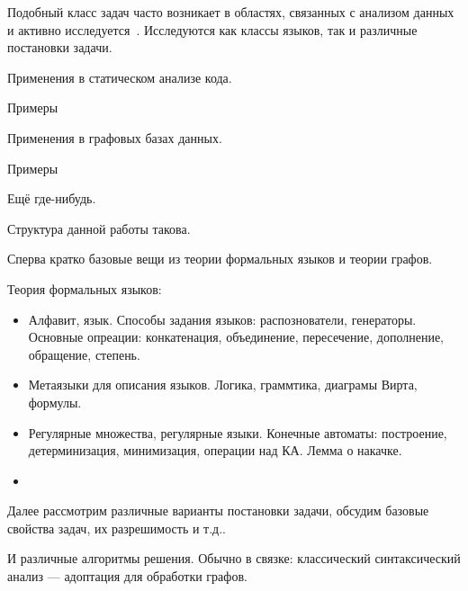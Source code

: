 Подобный класс задач часто возникает в областях, связанных с анализом данных и активно исследуется~\cite{doi:10.1137/S0097539798337716,axelsson2011formal,10.1007/978-3-642-22321-1_24,Ward:2010:CRL:1710158.1710234,barrett2007label,doi:10.1137/S0097539798337716}.
Исследуются как классы языков, так и различные постановки задачи.

Применения в статическом анализе кода.
\begin{example}
Примеры
\end{example}

Применения в графовых базах данных.
\begin{example}
Примеры
\end{example}

Ещё где-нибудь.

Структура данной работы такова.

Сперва кратко базовые вещи из теории формальных языков и теории графов.

Теория формальных языков:
\begin{itemize}
  \item Алфавит, язык. Способы задания языков: распознователи, генераторы. Основные опреации: конкатенация, объединение, пересечение, дополнение, обращение, степень.
  \item Метаязыки для описания языков. Логика, граммтика, диаграмы Вирта, формулы.
  \item Регулярные множества, регулярные языки. Конечные автоматы: построение, детерминизация, минимизация, операции над КА. Лемма о накачке.
  \item
\end{itemize}

Далее рассмотрим различные варианты постановки задачи, обсудим базовые свойства задач, их разрешимость и т.д..

И различные алгоритмы решения.
Обычно в связке: классический синтаксический анализ --- адоптация для обработки графов.
